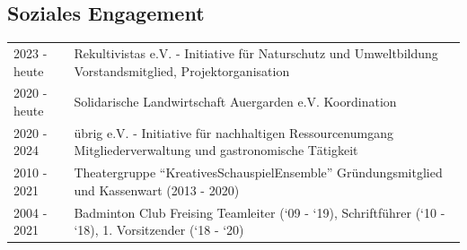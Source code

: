 \documentclass[a4paper,10pt]{memoir}
\begin{document}
\subsection*{Soziales Engagement}
\vspace*{-\baselineskip}
\begin{longtable}{@{}p{} p{}}
  2023 - heute &
  Rekultivistas e.V. - Initiative für Naturschutz und Umweltbildung \newline
  Vorstandsmitglied, Projektorganisation
  \\
  2020 - heute &
  Solidarische Landwirtschaft Auergarden e.V. \newline
  Koordination
  \\
  2020 - 2024 &
  übrig e.V. - Initiative für nachhaltigen Ressourcenumgang \newline
  Mitgliederverwaltung und gastronomische Tätigkeit
  \\
  2010 - 2021 &
  Theatergruppe ``KreativesSchauspielEnsemble'' \newline
  Gründungsmitglied und Kassenwart (2013 - 2020)
  \\
  2004 - 2021 &
  Badminton Club Freising \newline
  Teamleiter (`09 - `19), Schriftführer (`10 - `18), 1. Vorsitzender (`18 - `20)
\end{longtable}
\end{document}
